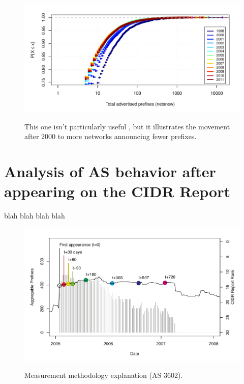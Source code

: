 \begin{figure}[H]
\begin{centering}
    \includegraphics[width=6in]{figures/netgain_netsnow_cdf_gcr.pdf}
    \vspace{-2em}\\
    \caption{This one isn't particularly useful , but it illustrates the movement after 2000 to more networks announcing fewer prefixes.}
\end{centering}
\end{figure}



\section{Analysis of AS behavior after appearing on the CIDR Report}

blah blah blah blah

\begin{figure}[H]
\begin{centering}
    \includegraphics[width=6in]{figures/single_as.pdf}
    \vspace{-2em}\\
    \caption{Measurement methodology explanation (AS 3602).}
\end{centering}
\end{figure}



